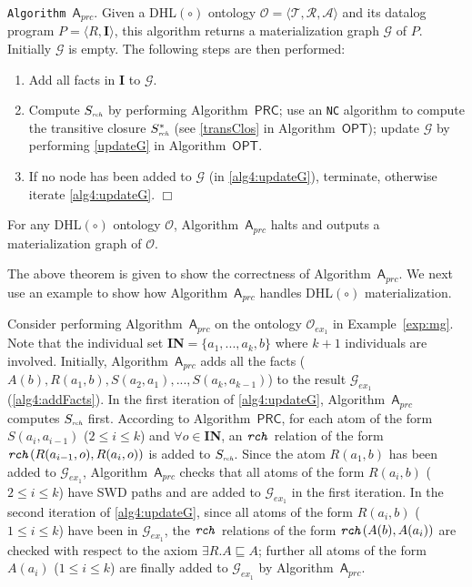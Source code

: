 \documentclass[final,1p,times]{elsarticle}
\begin{document}
\noindent\texttt{Algorithm~$\mathsf{A}_{prc}$}. Given
a DHL$(\circ)$ ontology $\mathcal{O}=\langle\mathcal{T},\mathcal{R},\mathcal{A}\rangle$ and its
datalog program $P=\langle R, \textbf{I}\rangle$, this algorithm
returns a materialization graph $\mathcal{G}$ of $P$.
Initially $\mathcal{G}$ is empty. The following steps are then performed:
\begin{enumerate}[leftmargin=8ex,label=(\textit{Step \arabic*}),ref=Step~\arabic*]
\item Add all facts in $\textbf{I}$ to $\mathcal{G}$.\label{alg4:addFacts}
\item Compute $S_{\textit{\tiny rch}}$ by performing Algorithm~$\mathsf{PRC}$; use an \texttt{NC}
    algorithm to compute the transitive closure $S^*_{\textit{\tiny rch}}$ (see \ref{transClos} in Algorithm~$\mathsf{OPT}$);
    update $\mathcal{G}$ by performing \ref{updateG} in Algorithm~$\mathsf{OPT}$.\label{alg4:updateG}
\item If no node has been added to $\mathcal{G}$ (in \ref{alg4:updateG}), terminate,
    otherwise iterate \ref{alg4:updateG}. \label{alg4:halt}\hfill$\Box$
\end{enumerate}

\begin{theorem}\label{theorem:aprc}
For any DHL$(\circ)$ ontology $\mathcal{O}$, Algorithm~$\mathsf{A}_{prc}$ halts and outputs
a materialization graph of $\mathcal{O}$.
\end{theorem}

The above theorem is given to show the correctness of Algorithm~$\mathsf{A}_{prc}$.
We next use an example to show how Algorithm~$\mathsf{A}_{prc}$ handles
DHL$(\circ)$ materialization.

\begin{example}\label{exp:prc}
Consider performing Algorithm~$\mathsf{A}_{prc}$ on the ontology
$\mathcal{O}_{ex_1}$ in Example~\ref{exp:mg}. Note that the individual
set \textbf{IN}$=\{a_1,...,a_k,b\}$ where $k+1$ individuals are involved.
Initially, Algorithm~$\mathsf{A}_{prc}$ adds
all the facts ($A(b),R(a_1,b),S(a_2,a_1),...,S(a_{k},a_{k-1})$) to the
result $\mathcal{G}_{ex_1}$ (\ref{alg4:addFacts}). In the first iteration of
\ref{alg4:updateG}, Algorithm~$\mathsf{A}_{prc}$ computes $S_{\textit{\tiny rch}}$ first.
According to Algorithm~$\mathsf{PRC}$, for each atom of the form $S(a_i,a_{i-1})$ ($2\leq i\leq k$)
and $\forall o\in$\textbf{IN},
an $\texttt{\emph{rch}}$ relation of the form $\texttt{\emph{rch}}(R(a_{i-1},o),R(a_i,o))$ is added to
$S_{\textit{\tiny rch}}$. Since the atom $R(a_1,b)$ has been added to $\mathcal{G}_{ex_1}$,
Algorithm~$\mathsf{A}_{prc}$ checks that all atoms of the form $R(a_i,b)$ ($2\leq i\leq k$)
have SWD paths and are added to $\mathcal{G}_{ex_1}$ in the first iteration.
In the second iteration of \ref{alg4:updateG}, since all atoms of the form $R(a_i,b)$ ($1\leq i\leq k$)
have been in $\mathcal{G}_{ex_1}$, the $\texttt{\emph{rch}}$ relations of the form $\texttt{\emph{rch}}(A(b),A(a_i))$
are checked with respect to the axiom $\exists R.A\sqsubseteq A$; further all
atoms of the form $A(a_i)$ ($1\leq i\leq k$) are finally added to $\mathcal{G}_{ex_1}$
by Algorithm~$\mathsf{A}_{prc}$.
\end{example}
\end{document}

